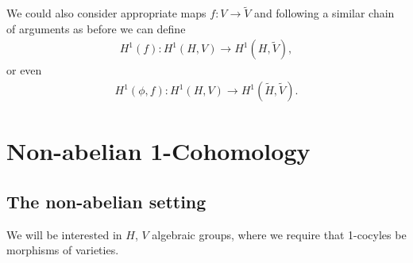 We could also consider appropriate maps $f:V\rightarrow\tilde{V}$ and following a similar chain of arguments as before we can define
\begin{eqnarray*}
	H^1(f):H^1(H, V)\rightarrow H^1(H, \tilde{V}),
\end{eqnarray*}
or even	
\begin{eqnarray*}
	H^1(\phi, f):H^1(H, V)\rightarrow H^1(\tilde{H}, \tilde{V}).
\end{eqnarray*}

\section{Non-abelian 1-Cohomology}
	
\subsection{The non-abelian setting}

We will be interested in $H$, $V$ algebraic groups, where we require that 1-cocyles be morphisms of varieties. 

